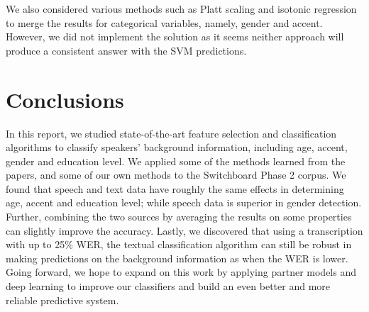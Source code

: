 \documentclass[a4paper]{article}
\begin{document}
We also considered various methods such as Platt scaling \cite{platt} and isotonic regression to merge the results for categorical variables, namely, gender and accent. However, we did not implement the solution as it seems neither approach will produce a consistent answer with the SVM predictions. 

\section{Conclusions}
In this report, we studied state-of-the-art feature selection and classification algorithms to classify speakers' background information, including age, accent, gender and education level. We applied some of the methods learned from the papers, and some of our own methods to the Switchboard Phase 2 corpus. We found that speech and text data have roughly the same effects in determining age, accent and education level; while speech data is superior in gender detection. Further, combining the two sources by averaging the results on some properties can slightly improve the accuracy. Lastly, we discovered that using a transcription with up to 25\% WER, the textual classification algorithm can still be robust in making predictions on the background information as when the WER is lower. Going forward, we hope to expand on this work by applying partner models and deep learning to improve our classifiers and build an even better and more reliable predictive system.
\end{document}
